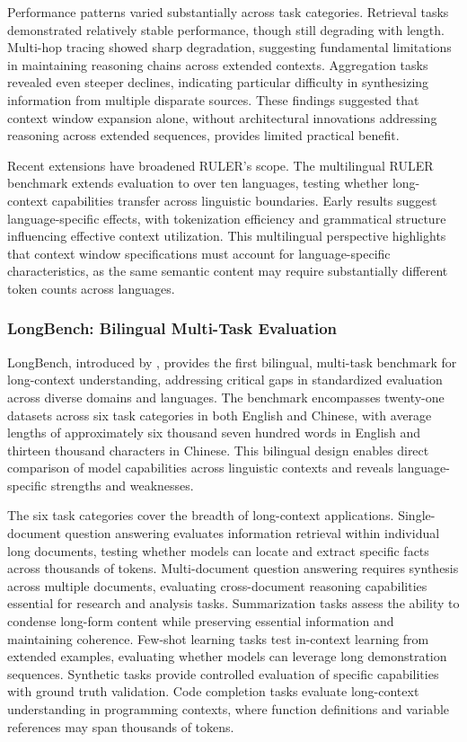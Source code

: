 \documentclass[11pt,letterpaper]{article}
\begin{document}
Performance patterns varied substantially across task categories. Retrieval tasks demonstrated relatively stable performance, though still degrading with length. Multi-hop tracing showed sharp degradation, suggesting fundamental limitations in maintaining reasoning chains across extended contexts. Aggregation tasks revealed even steeper declines, indicating particular difficulty in synthesizing information from multiple disparate sources. These findings suggested that context window expansion alone, without architectural innovations addressing reasoning across extended sequences, provides limited practical benefit.

Recent extensions have broadened RULER's scope. The multilingual RULER benchmark extends evaluation to over ten languages, testing whether long-context capabilities transfer across linguistic boundaries. Early results suggest language-specific effects, with tokenization efficiency and grammatical structure influencing effective context utilization. This multilingual perspective highlights that context window specifications must account for language-specific characteristics, as the same semantic content may require substantially different token counts across languages.

\subsubsection{LongBench: Bilingual Multi-Task Evaluation}

LongBench, introduced by \cite{bai2024longbench}, provides the first bilingual, multi-task benchmark for long-context understanding, addressing critical gaps in standardized evaluation across diverse domains and languages. The benchmark encompasses twenty-one datasets across six task categories in both English and Chinese, with average lengths of approximately six thousand seven hundred words in English and thirteen thousand characters in Chinese. This bilingual design enables direct comparison of model capabilities across linguistic contexts and reveals language-specific strengths and weaknesses.

The six task categories cover the breadth of long-context applications. Single-document question answering evaluates information retrieval within individual long documents, testing whether models can locate and extract specific facts across thousands of tokens. Multi-document question answering requires synthesis across multiple documents, evaluating cross-document reasoning capabilities essential for research and analysis tasks. Summarization tasks assess the ability to condense long-form content while preserving essential information and maintaining coherence. Few-shot learning tasks test in-context learning from extended examples, evaluating whether models can leverage long demonstration sequences. Synthetic tasks provide controlled evaluation of specific capabilities with ground truth validation. Code completion tasks evaluate long-context understanding in programming contexts, where function definitions and variable references may span thousands of tokens.
\end{document}
